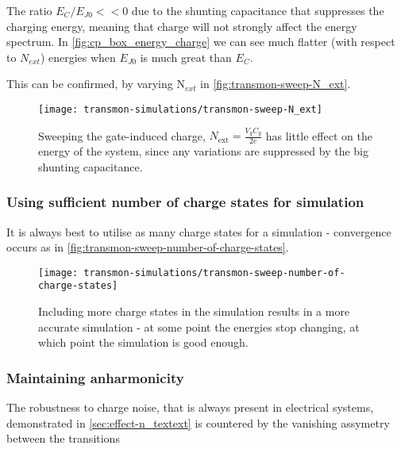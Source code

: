 The ratio  $E_{C}/E_{J0}<<0$ due to the  shunting capacitance that suppresses  the charging energy, meaning  that charge
will not  strongly affect  the energy  spectrum.  In \autoref{fig:cp_box_energy_charge}  we can  see much  flatter (with
respect to $N_{ext}$) energies when $E_{J0}$ is much great than $E_C$.

This can be confirmed, by varying N$_{ext}$ in \autoref{fig:transmon-sweep-N_ext}.

\begin{figure}[h]
  \centering \texttt{[image: transmon-simulations/transmon-sweep-N\_ext]}
  \caption{\small Sweeping  the gate-induced charge, $N_{\text{ext}}  = \frac{V_{g}C_{g}}{2e}$ has little  effect on the
    energy    of     the    system,    since    any     variations    are    suppressed    by     the    big    shunting
    capacitance. \label{fig:transmon-sweep-N_ext}}
\end{figure}

\subsubsection{Using sufficient number of charge states for simulation}
\label{sec:note-simulation}

It   is  always   best  to   utilise  as   many  charge   states  for   a  simulation   -  convergence   occurs  as   in
\autoref{fig:transmon-sweep-number-of-charge-states}.

\begin{figure}[h]
  \centering \texttt{[image: transmon-simulations/transmon-sweep-number-of-charge-states]}
  \caption{\small Including more charge states  in the simulation results in a more accurate  simulation - at some point
    the      energies      stop      changing,      at       which      point      the      simulation      is      good
    enough.\label{fig:transmon-sweep-number-of-charge-states}}
\end{figure}

\subsubsection{Maintaining anharmonicity}
\label{sec:maint-anharm}

The   robustness   to   charge   noise,   that   is    always   present   in   electrical   systems,   demonstrated   in
\autoref{sec:effect-n_textext} is countered by the vanishing assymetry between the transitions

